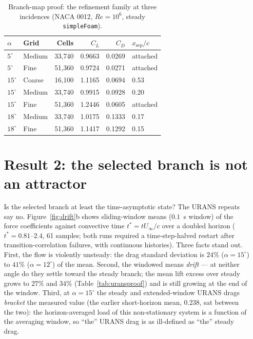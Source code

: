 \documentclass[10pt,a4paper]{article}
\begin{document}
\begin{table}[!htb]
  \centering\footnotesize
  \caption{Branch-map proof: the refinement family at three incidences (NACA 0012, $Re=10^6$, steady \texttt{simpleFoam}).}
  \label{tab:branch}
  \begin{tabular}{llrrrl}
    \toprule
    $\alpha$ & Grid & Cells & $C_L$ & $C_D$ & $x_{\mathrm{sep}}/c$ \\
    \midrule
    $5^\circ$  & Medium & 33{,}740 & 0.9663 & 0.0269 & attached \\
    $5^\circ$  & Fine   & 51{,}360 & 0.9724 & 0.0271 & attached \\
    $15^\circ$ & Coarse & 16{,}100 & 1.1165 & 0.0694 & 0.53 \\
    $15^\circ$ & Medium & 33{,}740 & 0.9915 & 0.0928 & 0.20 \\
    $15^\circ$ & Fine   & 51{,}360 & 1.2446 & 0.0605 & attached \\
    $18^\circ$ & Medium & 33{,}740 & 1.0175 & 0.1333 & 0.17 \\
    $18^\circ$ & Fine   & 51{,}360 & 1.1417 & 0.1292 & 0.15 \\
    \bottomrule
  \end{tabular}
\end{table}

\section{Result 2: the selected branch is not an attractor}\label{sec:attractor}
Is the selected branch at least the time-asymptotic state? The URANS repeats say no. Figure~\ref{fig:drift}b shows sliding-window means ($0.1$~s window) of the force coefficients against convective time $t^* = tU_\infty/c$ over a doubled horizon ($t^* = 0.81$--$2.4$, 61 samples; both runs required a time-step-halved restart after transition-correlation failures, with continuous histories). Three facts stand out. First, the flow is violently unsteady: the drag standard deviation is $24\%$ ($\alpha = 15^\circ$) to $41\%$ ($\alpha = 12^\circ$) of the mean. Second, the windowed means \emph{drift} --- at neither angle do they settle toward the steady branch; the mean lift excess over steady grows to $27\%$ and $34\%$ (Table~\ref{tab:uransproof}) and is still growing at the end of the window. Third, at $\alpha = 15^\circ$ the steady and extended-window URANS drags \emph{bracket} the measured value (the earlier short-horizon mean, $0.238$, sat between the two): the horizon-averaged load of this non-stationary system is a function of the averaging window, so ``the'' URANS drag is as ill-defined as ``the'' steady drag.
\end{document}
